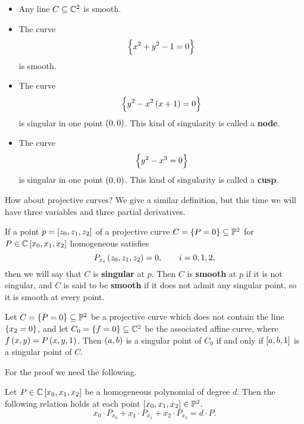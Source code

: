 \begin{example}
\hfill
\begin{itemize}
\item Any line $ C \subseteq \mathbb{C}^2 $ is smooth.
\item The curve
$$ \cbr{x^2 + y^2 - 1 = 0} $$
is smooth.
\item The curve
$$ \cbr{y^2 - x^2\br{x + 1} = 0} $$
is singular in one point $ \br{0, 0} $. This kind of singularity is called a \textbf{node}.
\item The curve
$$ \cbr{y^2 - x^3 = 0} $$
is singular in one point $ \br{0, 0} $. This kind of singularity is called a \textbf{cusp}.
\end{itemize}
\end{example}

How about projective curves? We give a similar definition, but this time we will have three variables and three partial derivatives.

\begin{definition}
If a point $ p = \sbr{z_0, z_1, z_2} $ of a projective curve $ C = \cbr{P = 0} \subseteq \PP^2 $ for $ P \in \CC\sbr{x_0, x_1, x_2} $ homogeneous satisfies
$$ P_{x_i}\br{z_0, z_1, z_2} = 0, \qquad i = 0, 1, 2, $$
then we will say that $ C $ is \textbf{singular} at $ p $. Then $ C $ is \textbf{smooth} at $ p $ if it is not singular, and $ C $ is said to be \textbf{smooth} if it does not admit any singular point, so it is smooth at every point.
\end{definition}

\begin{lemma}
\label{lem:7.5}
Let $ C = \cbr{P = 0} \subseteq \PP^2 $ be a projective curve which does not contain the line $ \cbr{x_2 = 0} $, and let $ C_0 = \cbr{f = 0} \subseteq \CC^2 $ be the associated affine curve, where $ f\br{x, y} = P\br{x, y, 1} $. Then $ \br{a, b} $ is a singular point of $ C_0 $ if and only if $ \sbr{a, b, 1} $ is a singular point of $ C $.
\end{lemma}

\pagebreak

For the proof we need the following.

\begin{theorem}
\label{thm:7.6}
Let $ P \in \CC\sbr{x_0, x_1, x_2} $ be a homogeneous polynomial of degree $ d $. Then the following relation holds at each point $ \sbr{x_0, x_1, x_2} \in \PP^2 $.
$$ x_0 \cdot P_{x_0} + x_1 \cdot P_{x_1} + x_2 \cdot P_{x_2} = d \cdot P. $$
\end{theorem}


